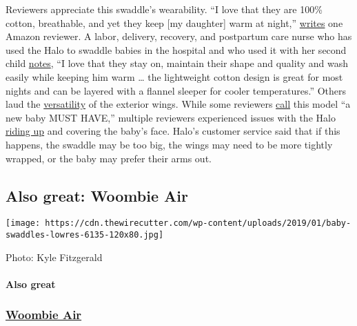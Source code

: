 Reviewers appreciate this swaddle's wearability. ``I love that they are
100\% cotton, breathable, and yet they keep {[}my daughter{]} warm at
night,''
\href{https://www.amazon.com/gp/customer-reviews/RH53GRG1HBRHI?tag=thewire06-20\&linkCode=xm2\&ascsubtag=YT78495}{writes}
one Amazon reviewer. A labor, delivery, recovery, and postpartum care
nurse who has used the Halo to swaddle babies in the hospital and who
used it with her second child
\href{https://www.amazon.com/gp/customer-reviews/RSS4OM4QPDOZA?tag=thewire06-20\&linkCode=xm2\&ascsubtag=YT78495}{notes},
``I love that they stay on, maintain their shape and quality and wash
easily while keeping him warm \ldots{} the lightweight cotton design is
great for most nights and can be layered with a flannel sleeper for
cooler temperatures.'' Others laud the
\href{https://www.amazon.com/gp/customer-reviews/R27TW5D9HWE2G7?tag=thewire06-20\&linkCode=xm2\&ascsubtag=YT78495}{versatility}
of the exterior wings. While some reviewers
\href{https://www.amazon.com/gp/customer-reviews/R1MBCH6VA2M2Z5?tag=thewire06-20\&linkCode=xm2\&ascsubtag=YT78495}{call}
this model ``a new baby MUST HAVE,'' multiple reviewers experienced
issues with the Halo
\href{https://www.amazon.com/gp/customer-reviews/R17U5ZEO4X0AW4?tag=thewire06-20\&linkCode=xm2\&ascsubtag=YT78495}{riding
up} and covering the baby's face. Halo's customer service said that if
this happens, the swaddle may be too big, the wings may need to be more
tightly wrapped, or the baby may prefer their arms out.

\hypertarget{also-great-woombie-air}{%
\subsection{Also great: Woombie Air}\label{also-great-woombie-air}}

\texttt{[image: https://cdn.thewirecutter.com/wp-content/uploads/2019/01/baby-swaddles-lowres-6135-120x80.jpg]}

Photo: Kyle Fitzgerald

\hypertarget{also-great-2}{%
\paragraph{Also great}\label{also-great-2}}

\href{https://www.nytimes3xbfgragh.onion/wirecutter/out/link/30688/154051/4/86634?merchant=BuyBuy\%20Baby}{}

\hypertarget{woombie-air-2}{%
\subsubsection{\texorpdfstring{\href{https://www.nytimes3xbfgragh.onion/wirecutter/out/link/30688/154051/4/86634?merchant=BuyBuy\%20Baby}{Woombie
Air}}{Woombie Air}}\label{woombie-air-2}}

